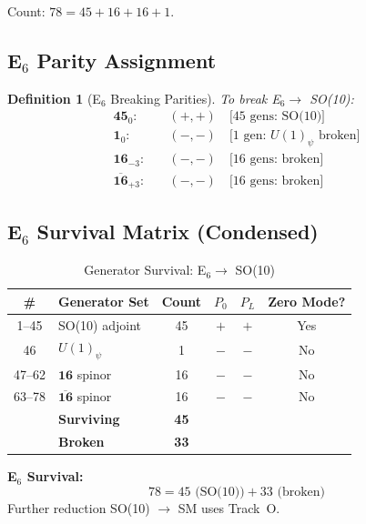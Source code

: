 \documentclass[11pt,a4paper]{article}
\newtheorem{definition}[theorem]{Definition}
\begin{document}
Count: $78 = 45 + 16 + 16 + 1$.

\subsection{E$_6$ Parity Assignment}

\begin{definition}[E$_6$ Breaking Parities]
\label{def:e6-parity}
To break E$_6 \to$ SO(10):
\begin{align}
  \mathbf{45}_0: & \quad (+,+) \quad \text{[45 gens: SO(10)]}
  \label{eq:e6-p1} \\
  \mathbf{1}_0: & \quad (-,-) \quad \text{[1 gen: $U(1)_\psi$ broken]}
  \label{eq:e6-p2} \\
  \mathbf{16}_{-3}: & \quad (-,-) \quad \text{[16 gens: broken]}
  \label{eq:e6-p3} \\
  \mathbf{\overline{16}}_{+3}: & \quad (-,-) \quad \text{[16 gens: broken]}
  \label{eq:e6-p4}
\end{align}
\end{definition}

\subsection{E$_6$ Survival Matrix (Condensed)}

\begin{table}[ht]
\centering
\caption{Generator Survival: E$_6 \to$ SO(10)}
\label{tab:e6-survival}
\small
\begin{tabular}{clcccc}
\toprule
\# & Generator Set & Count & $P_0$ & $P_L$ & Zero Mode? \\
\midrule
1--45 & SO(10) adjoint & 45 & $+$ & $+$ & Yes \\
46 & $U(1)_\psi$ & 1 & $-$ & $-$ & No \\
47--62 & $\mathbf{16}$ spinor & 16 & $-$ & $-$ & No \\
63--78 & $\mathbf{\overline{16}}$ spinor & 16 & $-$ & $-$ & No \\
\midrule
& \textbf{Surviving} & \textbf{45} & & & \\
& \textbf{Broken} & \textbf{33} & & & \\
\bottomrule
\end{tabular}
\end{table}

\begin{resultbox}
\textbf{E$_6$ Survival:}
\begin{equation}
  78 = 45 \text{ (SO(10))} + 33 \text{ (broken)}
  \label{eq:e6-count}
\end{equation}
Further reduction SO(10) $\to$ SM uses Track~O.
\end{resultbox}
\end{document}
